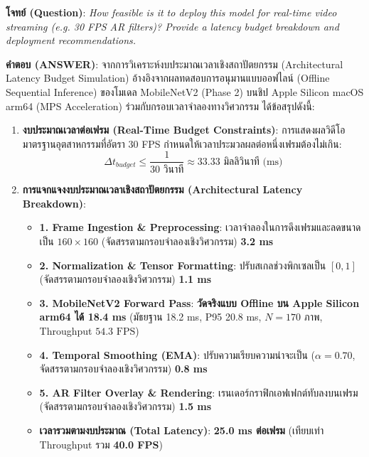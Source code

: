 \documentclass[12pt,a4paper]{article}
\begin{document}
\begin{ansbox}[fontupper=\small, left=6pt, right=6pt, top=3pt, bottom=3pt]
\textbf{โจทย์ (Question)}: \textit{How feasible is it to deploy this model for real-time video streaming (e.g. 30 FPS AR filters)? Provide a latency budget breakdown and deployment recommendations.}

\vspace{0.25em}
\textbf{คำตอบ (ANSWER)}:
จากการวิเคราะห์งบประมาณเวลาเชิงสถาปัตยกรรม (Architectural Latency Budget Simulation) อ้างอิงจากผลทดสอบการอนุมานแบบออฟไลน์ (Offline Sequential Inference) ของโมเดล MobileNetV2 (Phase 2) บนชิป Apple Silicon macOS arm64 (MPS Acceleration) ร่วมกับกรอบเวลาจำลองทางวิศวกรรม ได้ข้อสรุปดังนี้:

\begin{enumerate}[leftmargin=14pt, itemsep=1.5pt, topsep=1pt, parsep=0pt]
    \item \textbf{งบประมาณเวลาต่อเฟรม (Real-Time Budget Constraints)}:
    การแสดงผลวิดีโอมาตรฐานอุตสาหกรรมที่อัตรา 30 FPS กำหนดให้เวลาประมวลผลต่อหนึ่งเฟรมต้องไม่เกิน:
    $$\Delta t_{budget} \le \frac{1}{30\text{ วินาที}} \approx 33.33\text{ มิลลิวินาที (ms)}$$
    \item \textbf{การแจกแจงงบประมาณเวลาเชิงสถาปัตยกรรม (Architectural Latency Breakdown)}:
    \begin{itemize}[leftmargin=10pt, itemsep=0.5pt, topsep=0.5pt, parsep=0pt]
        \item \textbf{1. Frame Ingestion \& Preprocessing}: เวลาจำลองในการดึงเฟรมและลดขนาดเป็น $160 \times 160$ (จัดสรรตามกรอบจำลองเชิงวิศวกรรม) \textbf{3.2 ms}
        \item \textbf{2. Normalization \& Tensor Formatting}: ปรับสเกลช่วงพิกเซลเป็น $[0, 1]$ (จัดสรรตามกรอบจำลองเชิงวิศวกรรม) \textbf{1.1 ms}
        \item \textbf{3. MobileNetV2 Forward Pass}: \textbf{วัดจริงแบบ Offline บน Apple Silicon arm64 ได้ 18.4 ms} (มัธยฐาน 18.2 ms, P95 20.8 ms, $N=170$ ภาพ, Throughput $54.3\text{ FPS}$)
        \item \textbf{4. Temporal Smoothing (EMA)}: ปรับความเรียบความน่าจะเป็น ($\alpha = 0.70$, จัดสรรตามกรอบจำลองเชิงวิศวกรรม) \textbf{0.8 ms}
        \item \textbf{5. AR Filter Overlay \& Rendering}: เรนเดอร์กราฟิกเอฟเฟกต์ทับลงบนเฟรม (จัดสรรตามกรอบจำลองเชิงวิศวกรรม) \textbf{1.5 ms}
        \item \textbf{เวลารวมตามงบประมาณ (Total Latency)}: \textbf{25.0 ms ต่อเฟรม} (เทียบเท่า Throughput รวม \textbf{40.0 FPS})
    \end{itemize}

\end{enumerate}
\end{ansbox}
\end{document}
